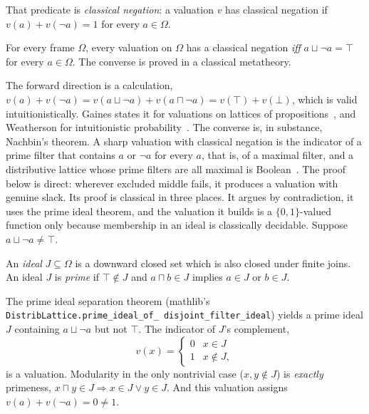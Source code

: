 That predicate is \emph{classical negation}: a valuation $v$ has
classical negation if $v(a) + v(\neg a) = 1$ for every $a \in \Omega$.

\begin{theorem}
\label{thm:hinge}
For every frame $\Omega$, every valuation on $\Omega$ has a classical
negation \emph{iff} $a \sqcup \neg a = \top$ for every
$a \in \Omega$. The converse is proved in a classical metatheory.
\end{theorem}

The forward direction is a
calculation, $v(a) + v(\neg a) = v(a \sqcup \neg a) + v(a \sqcap \neg a) =
v(\top) + v(\bot)$, which is valid intuitionistically. Gaines states it
for valuations on lattices of propositions~\cite{gaines1978}, and
Weatherson for intuitionistic probability~\cite{weatherson2003}. The
converse is, in substance, Nachbin's theorem. A sharp valuation with
classical negation is the indicator of a prime filter that contains $a$ or
$\neg a$ for every $a$, that is, of a maximal filter, and a distributive
lattice whose prime filters are all maximal is Boolean~\cite{nachbin1947}.
The proof below is direct: wherever excluded middle fails, it produces a
valuation with genuine slack. Its proof is classical in three places. It argues by
contradiction, it uses the prime ideal theorem, and the valuation it
builds is a $\{0,1\}$-valued function only because membership in an
ideal is classically decidable. Suppose $a \sqcup \neg a \neq \top$.

\begin{definition}
An \emph{ideal} $J \subseteq \Omega$ is a downward closed set which is also closed under finite joins. An ideal $J$ is \emph{prime} if $\top \notin J$ and $a \sqcap b \in J$ implies $a \in J$ or $b \in J$.
\end{definition}

The prime ideal separation theorem
(\textsf{mathlib}'s \texttt{DistribLattice.\allowbreak prime\_ideal\_of\_%
\allowbreak disjoint\_\allowbreak filter\_ideal}) yields a prime ideal $J$ containing
$a \sqcup \neg a$ but not $\top$.  The indicator of $J$'s
complement,
\[
  v(x) = \begin{cases} 0 & x \in J \\ 1 & x \notin J, \end{cases}
\]
is a valuation.  Modularity in the only nontrivial case ($x, y
\notin J$) is \emph{exactly} primeness, $x \sqcap y \in J
\Rightarrow x \in J \vee y \in J$.  And this valuation assigns
$v(a) + v(\neg a) = 0 \neq 1$.

